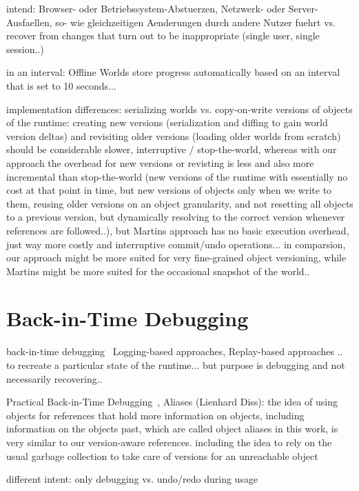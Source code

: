 intend: Browser- oder Betriebssystem-Abstuerzen, Netzwerk- oder Server-Ausfaellen, so- wie gleichzeitigen Aenderungen durch andere Nutzer fuehrt
vs. recover from changes that turn out to be inappropriate (single user, single session..)

in an interval: Offline Worlds store progress automatically based on an interval that is set to 10 seconds...

implementation differences: serializing worlds vs. copy-on-write versions of objects of the runtime: creating new versions (serialization and diffing to gain world version deltas) and revisiting older versions (loading older worlds from scratch) should be considerable slower, interruptive / stop-the-world, whereas with our approach the overhead for new versions or revisting is less and also more incremental than stop-the-world (new versions of the runtime with essentially no cost at that point in time, but new versions of objects only when we write to them, reusing older versions on an object granularity, and not resetting all objects to a previous version, but dynamically resolving to the correct version whenever references are followed..), but Martins approach has no basic execution overhead, just way more costly and interruptive commit/undo operations... in comparsion, our approach might be more suited for very fine-grained object versioning, while Martins might be more suited for the occasional snapshot of the world..



\section{Back-in-Time Debugging}

back-in-time debugging~\cite{Lewis2003BIT}
Logging-based approaches, Replay-based approaches .. to recreate a particular state of the runtime... but purpose is debugging and not necessarily recovering.. 

Practical Back-in-Time Debugging~\cite{Lienhard2008POB}, Aliases (Lienhard Diss): the idea of using objects for references that hold more information on objects, including information on the objects past, which are called object aliases in this work, is very similar to our version-aware references. including the idea to rely on the usual garbage collection to take care of versions for an unreachable object

different intent: only debugging vs. undo/redo during usage

